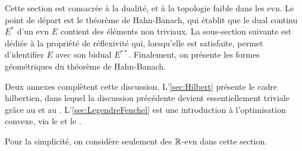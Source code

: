Cette section est consacrée à la dualité, et à la topologie faible dans les evn. 
Le point de départ est le théorème de Hahn-Banach, qui établit que le dual continu $E^*$ d'un evn $E$ contient des éléments non triviaux. 
La sous-section suivante est dédiée à la propriété de réflexivité qui, lorsqu'elle est satisfaite, permet d'identifier $E$ avec son bidual $E^{**}$. Finalement, on présente les formes géométriques du théorème de Hahn-Banach.

Deux annexes complètent cette discussion.
L'\cref{sec:Hilbert} présente le cadre hilbertien, dans lequel la discussion précédente devient essentiellement triviale grâce au  et au  . 
L'\cref{sec:LegendreFenchel} est une introduction à l'optimisation convexe, via le  et le .

Pour la simplicité, on considère seulement des $\mathbb{R}$-evn dans cette section.

